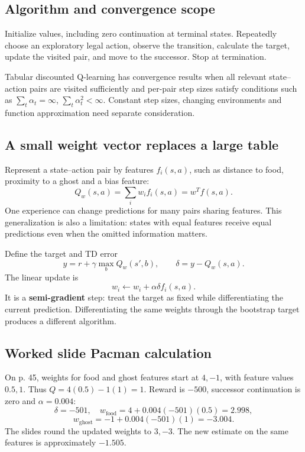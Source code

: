 \documentclass[11pt]{article}
\begin{document}
\subsection{Algorithm and convergence scope}
Initialize values, including zero continuation at terminal states. Repeatedly choose an exploratory legal action, observe the transition, calculate the target, update the visited pair, and move to the successor. Stop at termination.

Tabular discounted Q-learning has convergence results when all relevant state--action pairs are visited sufficiently and per-pair step sizes satisfy conditions such as $\sum_t\alpha_t=\infty$, $\sum_t\alpha_t^2<\infty$. Constant step sizes, changing environments and function approximation need separate consideration.
\subsection{A small weight vector replaces a large table}
Represent a state--action pair by features $f_i(s,a)$, such as distance to food, proximity to a ghost and a bias feature:
\[
Q_w(s,a)=\sum_iw_if_i(s,a)=w^Tf(s,a).
\]
One experience can change predictions for many pairs sharing features. This generalization is also a limitation: states with equal features receive equal predictions even when the omitted information matters.

Define the target and TD error
\[
y=r+\gamma\max_bQ_w(s',b),\qquad\delta=y-Q_w(s,a).
\]
The linear update is
\[
\boxed{w_i\leftarrow w_i+\alpha\delta f_i(s,a)}.
\]
It is a \textbf{semi-gradient} step: treat the target as fixed while differentiating the current prediction. Differentiating the same weights through the bootstrap target produces a different algorithm.
\subsection{Worked slide Pacman calculation}
On p. 45, weights for food and ghost features start at $4,-1$, with feature values $0.5,1$. Thus $Q=4(0.5)-1(1)=1$. Reward is $-500$, successor continuation is zero and $\alpha=0.004$:
\[
\delta=-501,\quad
w_{\mathrm{food}}=4+0.004(-501)(0.5)=2.998,
\]
\[
w_{\mathrm{ghost}}=-1+0.004(-501)(1)=-3.004.
\]
The slides round the updated weights to $3,-3$. The new estimate on the same features is approximately $-1.505$.
\end{document}
